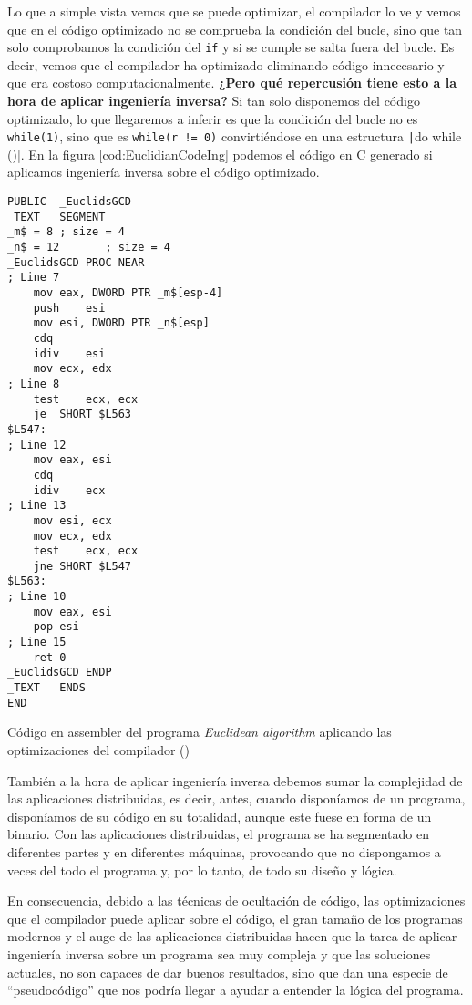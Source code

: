 Lo que a simple vista vemos que se puede optimizar, el compilador lo ve y vemos que en el código
optimizado no se comprueba la condición del bucle, sino que tan solo comprobamos la condición
del \texttt{if} y si se cumple se salta fuera del bucle. Es decir, vemos que el compilador
ha optimizado eliminando código innecesario y que era costoso computacionalmente. \textbf{¿Pero qué
repercusión tiene esto a la hora de aplicar ingeniería inversa?} Si tan solo disponemos del código
optimizado, lo que llegaremos a inferir es que la condición del bucle no es \texttt{while(1)},
sino que es \texttt{while(r != 0)} convirtiéndose en una estructura \texttt|do {} while ()|.
En la figura \ref{cod:EuclidianCodeIng} podemos el código en C generado si aplicamos ingeniería inversa sobre
el código optimizado.

\begin{mycode}
    \begin{verbatim}
PUBLIC	_EuclidsGCD
_TEXT	SEGMENT
_m$ = 8	; size = 4
_n$ = 12       ; size = 4
_EuclidsGCD PROC NEAR	
; Line 7
    mov	eax, DWORD PTR _m$[esp-4]
    push	esi
    mov	esi, DWORD PTR _n$[esp]
    cdq
    idiv	esi
    mov	ecx, edx
; Line 8
    test	ecx, ecx
    je	SHORT $L563
$L547:
; Line 12
    mov	eax, esi
    cdq
    idiv	ecx
; Line 13
    mov	esi, ecx
    mov	ecx, edx
    test	ecx, ecx
    jne	SHORT $L547
$L563:
; Line 10
    mov	eax, esi
    pop	esi
; Line 15
    ret	0
_EuclidsGCD ENDP
_TEXT	ENDS
END
    \end{verbatim}
    \caption[Código en assembler del programa \textit{Euclidean algorithm} aplicando las optimizaciones del compilador]{Código en assembler del programa \textit{Euclidean algorithm} aplicando las optimizaciones del compilador (\cite{EuclidianCode})}
    \label{cod:EuclidianCodeAsmOpt}
\end{mycode}

También a la hora de aplicar ingeniería inversa debemos sumar la complejidad de las aplicaciones
distribuidas, es decir, antes, cuando disponíamos de un programa, disponíamos de su código en
su totalidad, aunque este fuese en forma de un binario. Con las aplicaciones distribuidas, el
programa se ha segmentado en diferentes partes y en diferentes máquinas, provocando que no
dispongamos a veces del todo el programa y, por lo tanto, de todo su diseño y lógica.

En consecuencia, debido a las técnicas de ocultación de código, las optimizaciones que el compilador
puede aplicar sobre el código, el gran tamaño de los programas modernos y el auge de las aplicaciones
distribuidas hacen que la tarea de aplicar ingeniería inversa sobre un programa sea muy compleja y
que las soluciones actuales, no son capaces de dar buenos resultados, sino que dan una especie de
``pseudocódigo'' que nos podría llegar a ayudar a entender la lógica del programa.

